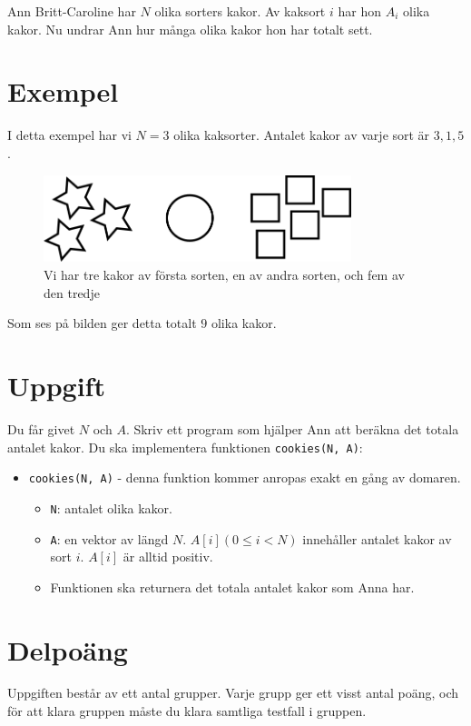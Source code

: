 \newcommand\version{v1}
Ann Britt-Caroline har $N$ olika sorters kakor. Av kaksort $i$ har hon $A_i$ olika kakor. Nu undrar Ann hur många olika kakor hon har totalt sett.

\section*{Exempel}
I detta exempel har vi $N = 3$ olika kaksorter. Antalet kakor av varje sort är $3, 1, 5$.

\begin{figure}[h!]
  \centering
  \includegraphics[width=0.8\textwidth]{sample.png}
  \caption{Vi har tre kakor av första sorten, en av andra sorten, och fem av den tredje}
\end{figure}

Som ses på bilden ger detta totalt $9$ olika kakor.

\section*{Uppgift}
Du får givet $N$ och $A$. Skriv ett program som hjälper Ann att beräkna det totala antalet kakor. Du ska implementera funktionen \texttt{cookies(N, A)}:
\begin{itemize}
  \item \texttt{cookies(N, A)} - denna funktion kommer anropas exakt en gång av domaren.
  \begin{itemize}
    \item \texttt{N}: antalet olika kakor.
    \item \texttt{A}: en vektor av längd $N$. $A[i] (0 \le i < N) $ innehåller antalet kakor av sort $i$. $A[i]$ är alltid positiv.
    \item Funktionen ska returnera det totala antalet kakor som Anna har.
  \end{itemize}
\end{itemize}

\section*{Delpoäng}
Uppgiften består av ett antal grupper. Varje grupp ger ett visst antal poäng, och för att klara
gruppen måste du klara samtliga testfall i gruppen.

